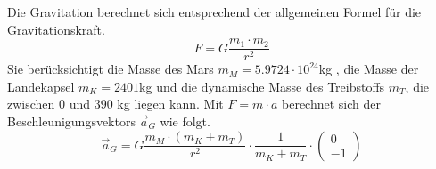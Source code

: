 Die Gravitation berechnet sich entsprechend der allgemeinen Formel für die Gravitationskraft.
$$F = G \frac{m_1 \cdot m_2}{r^{2}} $$
Sie berücksichtigt die Masse des Mars $m_M = 5.9724 \cdot 10^{24}$kg \cite{NASA2016}, die Masse der Landekapsel $m_K = 2401$kg \cite{Wikipedia2016b} und die dynamische Masse des Treibstoffs $m_T$, die zwischen 0 und 390 kg \cite{Wikipedia2016b} liegen kann. Mit $F = m \cdot a$ berechnet sich der Beschleunigungsvektors $\vec a_G$ wie folgt.
$$\vec a_G = G \frac{m_M \cdot (m_K + m_T)}{r^{2}} \cdot \frac{1}{m_K + m_T} \cdot \left(\begin{array}{c} 0 \\ -1 \end{array}\right)$$\\